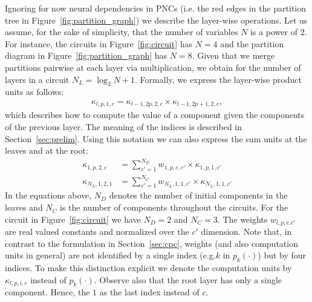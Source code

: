 \documentclass[letterpaper]{article} %
\newcommand{\eg}{e.g.\xspace}
\newcommand{\ie}{i.e.\xspace}
\newcommand{\circuit}{\ensuremath{p}}
\newcommand{\weight}{\ensuremath{w}}
\newcommand{\component}{\ensuremath{{\kappa}}}
\begin{document}
Ignoring for now neural dependencies in PNCs (\ie the red edges in the partition tree in Figure~\ref{fig:partition_graph}) we describe the layer-wise operations. Let us assume, for the sake of simplicity, that the number of variables $N$ is a power of $2$. For instance, the circuits in Figure~\ref{fig:circuit} has $N=4$ and the partition diagram in Figure~\ref{fig:partition_graph} has $N=8$. Given that we merge partitions pairwise at each layer via multiplication, we obtain for the number of layers in a circuit $N_L= \log_2 N+1$. Formally, we express the layer-wise product units as follows:
\begin{align}
    \component_{l,p,1,c} = \component_{l-1,2p,2,c} \times \component_{l-1,2p+1,2,c},
    \tag{ProductLayer}
\end{align}
which describes how to compute the value of a component given the components of the previous layer.
The meaning of the indices is described in Section~\ref{sec:prelim}. Using this notation we can also express the sum units at the leaves and at the root:
\begin{align}
    \component_{1,p,2,c}
     & =
    \sum_{c'=1}^{N_D} \weight_{1,p,c,c'} \times \component_{1,p,1,c'}
    \tag{SumLeaf}
    \\
    \component_{N_L,1,2,1}
     & =
    \sum_{c'=1}^{N_C} \weight_{N_L,1,1,c'} \times \component_{N_L,1,1,c'}
    \tag{SumRoot}
\end{align}
In the equations above, $N_D$ denotes the number of initial components in the leaves and $N_C$ is the number of components throughout the circuits.
For the circuit in Figure~\ref{fig:circuit} we have $N_D{=}2$ and $N_C{=}3$.
The weights $w_{l,p,c.c'}$ are real valued constants and normalized over the $c'$ dimension. Note that, in contrast to the formulation in Section~\ref{sec:cpc},
weights (and also computation units in general) are not identified by a single index (\eg $k$ in $\circuit_k(\cdot)$) but by four indices.
To make this distinction explicit we denote the computation units by $\kappa_{l,p,i,c}$ instead of $p_k(\cdot)$.
Observe also that the root layer has only a single component. Hence, the $1$ as the last index instead of $c$.
\end{document}
